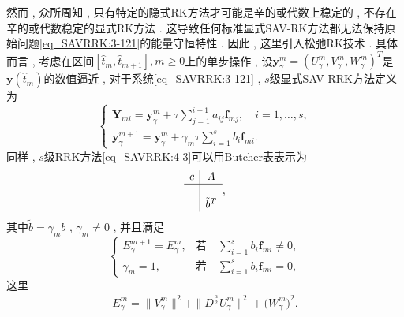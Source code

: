 然而 , 众所周知 , 只有特定的隐式RK方法才可能是辛的或代数上稳定的 , 不存在辛的或代数稳定的显式RK方法 . 
这导致任何标准显式SAV-RK方法都无法保持原始问题\eqref{eq_SAVRRK:3-121}的能量守恒特性 . 
因此 , 这里引入松弛RK技术 . 具体而言 , 考虑在区间$\left[\hat{t}_m , \hat{t}_{m+1}\right] , m \geq 0$上的单步操作 , 设$\bm{y}_\gamma^m=\left(U^{m}_{\gamma} , V^{m}_{\gamma} , W^{m}_{\gamma}\right)^T$是$\bm{y}\left(\hat{t}_m\right)$的数值逼近 , 
对于系统\eqref{eq_SAVRRK:3-121} , $s$级显式SAV-RRK方法定义为
\begin{equation}
\left\{\begin{array}{l}
\bm{Y}_{m i}=\bm{y}_\gamma^m+\tau \sum\limits_{j=1}^{i-1} a_{i j} \bm{f}_{m j} , \quad i=1 , \ldots , s , \\
\bm{y}_\gamma^{m+1}=\bm{y}_\gamma^m+\gamma_m \tau \sum\limits_{i=1}^s b_i \bm{f}_{m i} . 
\end{array}\right . \label{eq_SAVRRK:4-3}
\end{equation}
同样 , $s$级RRK方法\eqref{eq_SAVRRK:4-3}可以用Butcher表表示为
\begin{equation}
\begin{array}{c|c}
c & A \\
\hline \\
& \tilde{b}^T
\end{array} , 
\end{equation}
其中$\tilde{b}=\gamma_m b$ , $\gamma_m\neq 0$ , 并且满足
\begin{equation}
\left\{\begin{array}{ll}
E_{\gamma}^{m+1}=E_{\gamma}^{m} , & \text{若} \quad  \sum\limits_{i=1}^s b_i \bm{f}_{m i} \neq 0 , \\
\gamma_m=1 , & \text{若} \quad  \sum\limits_{i=1}^s b_i \bm{f}_{m i} =0 , 
\end{array}\right . \label{eq_SAVRRK:4-6}
\end{equation}
这里
\begin{align}\label{eq_SAVRRK:4-6b}
E_{\gamma}^{m}  =\|V_{\gamma}^{m}\|^2+\|D^\frac{\alpha}{2} U_{\gamma}^{m}\|^2+\big(W_{\gamma}^{m}\big)^2 . 
\end{align}

